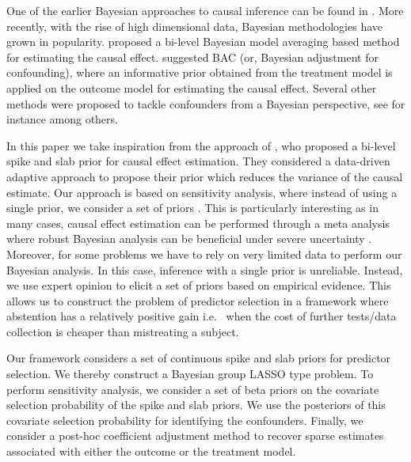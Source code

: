 \documentclass[preprint,12pt]{elsarticle}
\begin{document}
One of the earlier Bayesian approaches to causal inference
can be found in \citep{rubin1978}. More recently,
with the rise of high dimensional data,
Bayesian methodologies have grown in popularity.
 proposed a bi-level 
Bayesian model averaging based method for estimating the causal 
effect.  suggested BAC (or, Bayesian adjustment for
confounding),
where an informative prior obtained from
the treatment model is applied on the outcome model for
estimating the causal effect. Several other methods were
proposed to tackle confounders from a Bayesian perspective,
see for instance \citep{Zigler2014,Hahn2018} among others.

In this paper we take inspiration from the approach of \citet{koch2020}, who proposed a bi-level spike and slab prior for causal effect 
estimation. They considered a data-driven adaptive approach to
propose their prior which reduces the variance of the causal estimate. 
Our approach is based on
sensitivity analysis, where instead of using a single prior, 
we consider a set of priors \citep{BERGER1990303}. This is particularly 
interesting as in many cases, causal effect estimation can be performed 
through a meta analysis where robust Bayesian analysis 
can be beneficial under severe uncertainty \citep{raices_cruz22}.
Moreover, for some problems 
we have to rely on very limited data to perform our Bayesian analysis.
In this case,
inference with a single prior
is unreliable.
Instead, we use expert opinion to elicit a set of priors 
based on empirical evidence. 
This allows us to construct the problem of 
predictor selection
in a framework where abstention has a relatively positive gain i.e.~
when the cost of further tests/data collection is cheaper than
mistreating a subject.

Our framework considers a set of continuous spike and slab priors 
\citep{ishwaran2005} for
predictor selection.
We thereby construct a Bayesian group LASSO \citep{xu2015} type problem.
To perform sensitivity analysis,
we consider a set of beta priors on the covariate selection 
probability of the spike and slab priors. We use the posteriors of this
covariate selection probability for identifying the confounders. Finally, 
we consider a post-hoc coefficient adjustment method \citep{hahn2015}
to recover sparse estimates associated with either the outcome or the
treatment model. 
\end{document}
